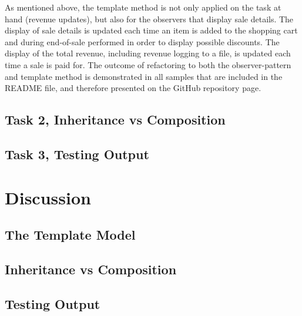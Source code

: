 \documentclass[a4paper]{scrreprt}
\newenvironment{longlisting}{\captionsetup{type=listing}}{}
\begin{document}
As mentioned above, the template method
is not only applied on the task at hand (revenue updates),
but also for the observers that display sale details.
The display of sale details is updated each time an item is added to the shopping cart
and during end-of-sale performed in order to display possible discounts.
The display of the total revenue, including revenue logging to a file, is updated
each time a sale is paid for.
The outcome of refactoring to both the observer-pattern and template method
is demonstrated in all samples that are included in the README file,
and therefore presented on the GitHub repository page.

\section*{Task 2, Inheritance vs Composition}
\section*{Task 3, Testing Output}


\chapter{Discussion}
\label{sec:discussion}
\section*{The Template Model}
\section*{Inheritance vs Composition}
\section*{Testing Output}
\end{document}
